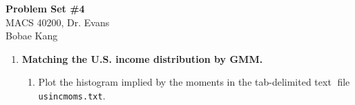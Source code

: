 \documentclass[letterpaper,12pt]{article}
\theoremstyle{definition}
\begin{document}
\begin{flushleft}
  \textbf{\large{Problem Set \#4}} \\
  MACS 40200, Dr. Evans \\
  Bobae Kang
\end{flushleft}

\vspace{5mm}

\begin{enumerate}
\item \textbf{Matching the U.S. income distribution by GMM.}
\begin{enumerate}
\item Plot the histogram implied by the moments in the tab-delimited text file \texttt{usincmoms.txt}.
\par
\begin{figure}[H]\centering\captionsetup{width=4.0in}
\end{figure}
\par\bigskip


\end{enumerate}
\end{enumerate}
\end{document}
